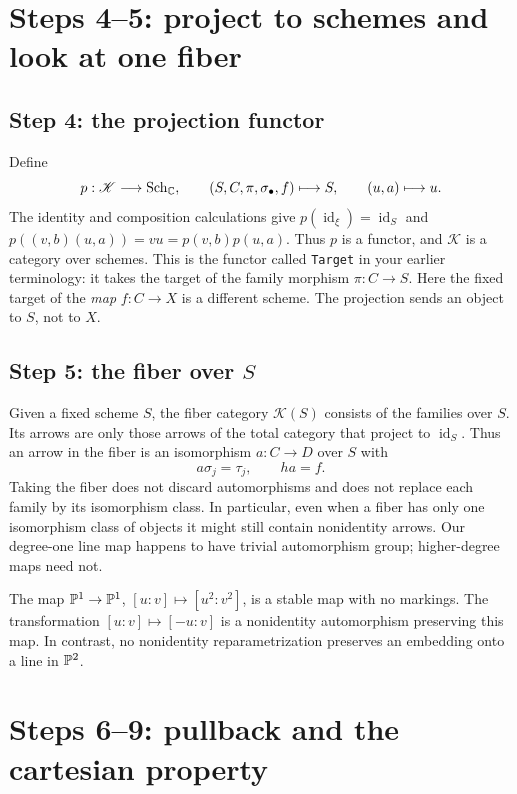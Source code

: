 \section{Steps 4--5: project to schemes and look at one fiber}

\subsection{Step 4: the projection functor}

Define
\[
 p:\mathscr K\longrightarrow\operatorname{Sch}_{\mathbb C},\qquad
 (S,C,\pi,\sigma_\bullet,f)\longmapsto S,\qquad (u,a)\longmapsto u.
\]
The identity and composition calculations give $p(\operatorname{id}_\xi)=\operatorname{id}_S$ and $p((v,b)(u,a))=vu=p(v,b)p(u,a)$. Thus $p$ is a functor, and $\mathscr K$ is a category over schemes. This is the functor called \texttt{Target} in your earlier terminology: it takes the target of the family morphism $\pi:C\to S$. Here the fixed target of the \emph{map} $f:C\to X$ is a different scheme. The projection sends an object to $S$, not to $X$.

\subsection{Step 5: the fiber over $S$}

Given a fixed scheme $S$, the fiber category $\mathscr K(S)$ consists of the families over $S$. Its arrows are only those arrows of the total category that project to $\operatorname{id}_S$. Thus an arrow in the fiber is an isomorphism $a:C\to D$ over $S$ with
\[
 a\sigma_j=\tau_j,\qquad ha=f.
\]
Taking the fiber does not discard automorphisms and does not replace each family by its isomorphism class. In particular, even when a fiber has only one isomorphism class of objects it might still contain nonidentity arrows. Our degree-one line map happens to have trivial automorphism group; higher-degree maps need not.

\begin{Ex}
The map $\mathbb P^1\to\mathbb P^1$, $[u:v]\mapsto[u^2:v^2]$, is a stable map with no markings. The transformation $[u:v]\mapsto[-u:v]$ is a nonidentity automorphism preserving this map. In contrast, no nonidentity reparametrization preserves an embedding onto a line in $\mathbb P^2$.
\end{Ex}

\section{Steps 6--9: pullback and the cartesian property}

